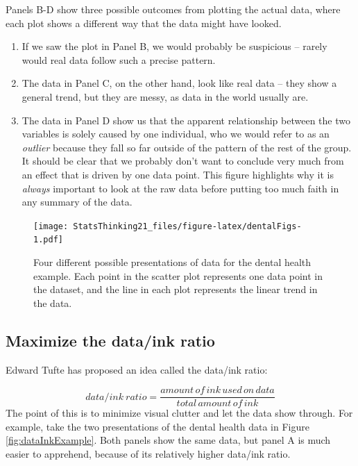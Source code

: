 \documentclass[12pt,]{book}
\providecommand{\tightlist}{%
  \setlength{\itemsep}{0pt}\setlength{\parskip}{0pt}}
\theoremstyle{definition}
\theoremstyle{definition}
\theoremstyle{definition}
\theoremstyle{remark}
\begin{document}
Panels B-D show three possible outcomes from plotting the actual data, where each plot shows a different way that the data might have looked.

\begin{enumerate}
\def\labelenumi{\arabic{enumi}.}
\setcounter{enumi}{1}
\tightlist
\item
  If we saw the plot in Panel B, we would probably be suspicious -- rarely would real data follow such a precise pattern.\\
\item
  The data in Panel C, on the other hand, look like real data -- they show a general trend, but they are messy, as data in the world usually are.\\
\item
  The data in Panel D show us that the apparent relationship between the two variables is solely caused by one individual, who we would refer to as an \emph{outlier} because they fall so far outside of the pattern of the rest of the group. It should be clear that we probably don't want to conclude very much from an effect that is driven by one data point. This figure highlights why it is \emph{always} important to look at the raw data before putting too much faith in any summary of the data.
\end{enumerate}

\begin{figure}
\centering
\texttt{[image: StatsThinking21\_files/figure-latex/dentalFigs-1.pdf]}
\caption{\label{fig:dentalFigs}Four different possible presentations of data for the dental health example. Each point in the scatter plot represents one data point in the dataset, and the line in each plot represents the linear trend in the data.}
\end{figure}

\hypertarget{maximize-the-dataink-ratio}{%
\subsection{Maximize the data/ink ratio}\label{maximize-the-dataink-ratio}}

Edward Tufte has proposed an idea called the data/ink ratio:

\[
data/ink\ ratio = \frac{amount\, of\, ink\, used\, on\, data}{total\, amount\, of\, ink}
\]
The point of this is to minimize visual clutter and let the data show through. For example, take the two presentations of the dental health data in Figure \ref{fig:dataInkExample}. Both panels show the same data, but panel A is much easier to apprehend, because of its relatively higher data/ink ratio.
\end{document}
